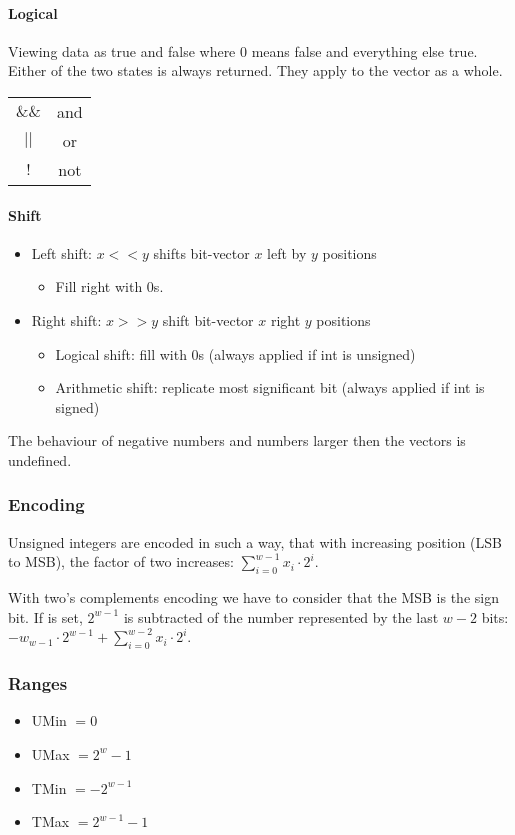 \paragraph{Logical}
Viewing data as true and false where $0$ means false and everything else true. Either of the two states is always returned. They apply to the vector as a whole.

\begin{tabular}{c | c}
    $\&\&$ & and\\
    $||$ & or\\
    $!$ & not
\end{tabular}

\paragraph{Shift}
\begin{itemize}
    \item Left shift: $x << y$ shifts bit-vector $x$ left by $y$ positions
        \begin{itemize}
            \item Fill right with $0$s.
        \end{itemize}
    \item Right shift: $x >> y$ shift bit-vector $x$ right $y$ positions
        \begin{itemize}
            \item Logical shift: fill with $0$s (always applied if int is unsigned)
            \item Arithmetic shift: replicate most significant bit (always applied if int is signed)
        \end{itemize}
\end{itemize}

The behaviour of negative numbers and numbers larger then the vectors is undefined.

\subsubsection{Encoding}
Unsigned integers are encoded in such a way, that with increasing position (LSB to MSB), the factor of two increases: $\sum_{i=0}^{w-1} x_i \cdot 2^i$.

With two's complements encoding we have to consider that the MSB is the sign bit. If is set, $2^{w-1}$ is subtracted of the number represented by the last $w-2$ bits: $-w_{w - 1} \cdot 2^{w - 1} + \sum_{i=0}^{w - 2} x_i \cdot 2^i$.

\subsubsection{Ranges}
\begin{itemize}
    \item UMin $= 0$
    \item UMax $= 2^w -1$
    \item TMin $=-2^{w - 1}$
    \item TMax $=2^{w-1} - 1$
\end{itemize}

